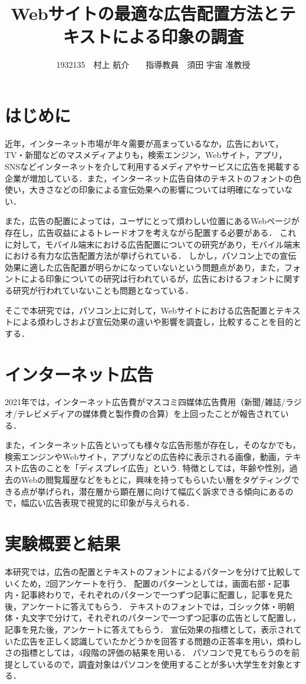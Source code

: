 \documentclass[twocolumn,10pt,a4j]{ltjsarticle}
\title{Webサイトの最適な広告配置方法とテキストによる印象の調査}
\author{1932135　村上 航介　　指導教員　須田 宇宙 准教授}
\date{}
\begin{document}
\maketitle

\section{はじめに}
近年，インターネット市場が年々需要が高まっているなか，広告において，TV・新聞などのマスメディアよりも，検索エンジン，Webサイト，アプリ，SNSなどインターネットを介して利用するメディアやサービスに広告を掲載する企業が増加している．また，インターネット広告自体のテキストのフォントの色使い，大きさなどの印象による宣伝効果への影響については明確になっていない．

また，広告の配置によっては，ユーザにとって煩わしい位置にあるWebページが存在し，広告収益によるトレードオフを考えながら配置する必要がある．
これに対して，モバイル端末における広告配置についての研究があり，モバイル端末における有力な広告配置方法が挙げられている\cite{mobile}．
しかし，パソコン上での宣伝効果に適した広告配置が明らかになっていないという問題点があり，また，フォントによる印象についての研究は行われているが，広告におけるフォントに関する研究が行われていないことも問題となっている．

そこで本研究では，パソコン上に対して，Webサイトにおける広告配置とテキストによる煩わしさおよび宣伝効果の違いや影響を調査し，比較することを目的とする．

\section{インターネット広告}
2021年では，インターネット広告費がマスコミ四媒体広告費用（新聞/雑誌/ラジオ/テレビメディアの媒体費と製作費の合算）を上回ったことが報告されている\cite{dentsu}．

また，インターネット広告といっても様々な広告形態が存在し，そのなかでも，検索エンジンやWebサイト，アプリなどの広告枠に表示される画像，動画，テキスト広告のことを「ディスプレイ広告」という.
特徴としては，年齢や性別，過去のWebの閲覧履歴などをもとに，興味を持ってもらいたい層をタゲティングできる点が挙げられ，潜在層から顕在層に向けて幅広く訴求できる傾向にあるので，幅広い広告表現で視覚的に印象が与えられる．

\section{実験概要と結果}
本研究では，広告の配置とテキストのフォントによるパターンを分けて比較していくため，2回アンケートを行う．
配置のパターンとしては，画面右部・記事内・記事終わりで，それぞれのパターンで一つずつ記事に配置し，記事を見た後，アンケートに答えてもらう．
テキストのフォントでは，ゴシック体・明朝体・丸文字で分けて，それぞれのパターンで一つずつ記事の広告として配置し，記事を見た後，アンケートに答えてもらう．
宣伝効果の指標として，表示されていた広告を正しく認識していたかどうかを回答する問題の正答率を用い，煩わしさの指標としては，4段階の評価の結果を用いる．
パソコンで見てもらうのを前提としているので，調査対象はパソコンを使用することが多い大学生を対象とする．
\end{document}
